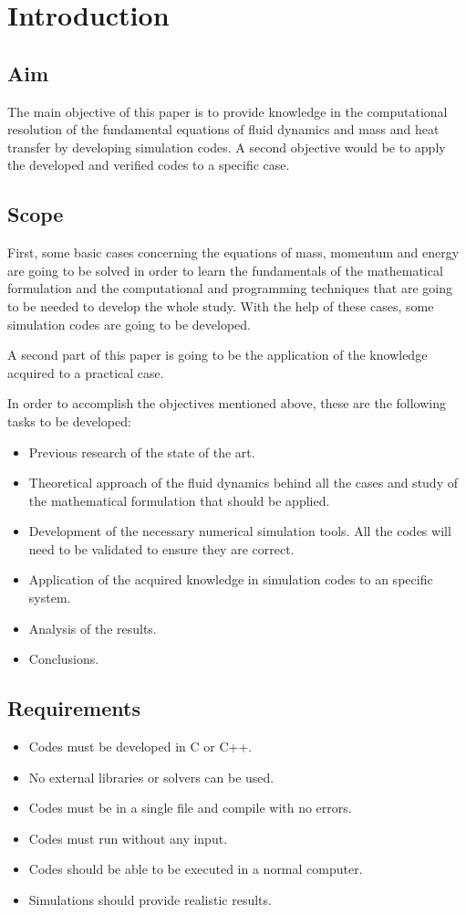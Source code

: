 \chapter{Introduction}
\section{Aim}
The main objective of this paper is to provide knowledge in the computational resolution of the fundamental equations of fluid dynamics and mass and heat transfer by developing simulation codes. A second objective would be to apply the developed and verified codes to a specific case.

\section{Scope}
First, some basic cases concerning the equations of mass, momentum and energy are going to be solved in order to learn the fundamentals of the mathematical formulation and the computational and programming techniques that are going to be needed to develop the whole study. With the help of these cases, some simulation codes are going to be developed.

A second part of this paper is going to be the application of the knowledge acquired to a practical case.

In order to accomplish the objectives mentioned above, these are the following tasks to be developed:
\begin{itemize}
	\item Previous research of the state of the art.
	\item Theoretical approach of the fluid dynamics behind all the cases and study of the mathematical formulation that should be applied.
	\item Development of the necessary numerical simulation tools. All the codes will need to be validated to ensure they are correct.
	\item Application of the acquired knowledge in simulation codes to an specific system.
	\item Analysis of the results.
	\item Conclusions.
\end{itemize}

\section{Requirements}
\begin{itemize}
	\item Codes must be developed in C or C++.
	\item No external libraries or solvers can be used.
	\item Codes must be in a single file and compile with no errors.
	\item Codes must run without any input.
	\item Codes should be able to be executed in a normal computer.
	\item Simulations should provide realistic results.
\end{itemize}

